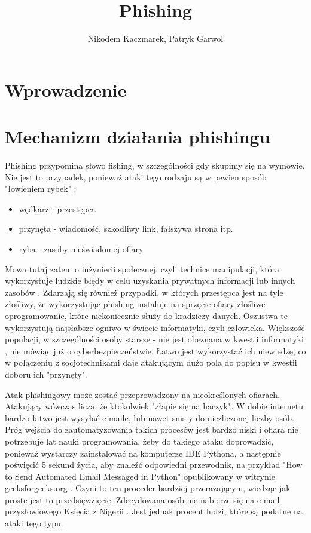 \documentclass[]{article}
\title{Phishing}
\author{Nikodem Kaczmarek, Patryk Garwol}
\begin{document}
\maketitle

\newpage 

\section{Wprowadzenie}



\newpage
\section{Mechanizm działania phishingu}

Phishing przypomina słowo fishing, w szczególności gdy skupimy się na wymowie. Nie jest to przypadek, ponieważ ataki tego rodzaju są w pewien sposób "łowieniem rybek" \cite{govpl_phishing}:
\begin{itemize}[label=$\rightarrow$]
	\item wędkarz - przestępca
	\item przynęta - wiadomość, szkodliwy link, fałszywa strona itp.
	\item ryba - zasoby nieświadomej ofiary
\end{itemize} 

Mowa tutaj zatem o inżynierii społecznej, czyli technice manipulacji, która wykorzystuje ludzkie błędy w celu uzyskania prywatnych informacji lub innych zasobów \cite{kaspersky_social_engineering}.
Zdarzają się również przypadki, w których przestępca jest na tyle złośliwy, że wykorzystując phishing instaluje na sprzęcie ofiary złośliwe oprogramowanie, które niekoniecznie służy do kradzieży danych. Oszustwa te wykorzystują najsłabsze ogniwo w świecie informatyki, czyli człowieka. Większość populacji, w szczególności osoby starsze - nie jest obeznana w kwestii informatyki \cite{dsgi_wiley}, nie mówiąc już o cyberbezpieczeństwie. Łatwo jest wykorzystać ich niewiedzę, co w połączeniu z socjotechnikami daje atakującym dużo pola do popisu w kwestii doboru ich "przynęty".

Atak phishingowy może zostać przeprowadzony na nieokreślonych ofiarach. Atakujący wówczas liczą, że ktokolwiek "złapie się na haczyk". W dobie internetu bardzo łatwo jest wysyłać e-maile, lub nawet sms-y do niezliczonej liczby osób. Próg wejścia do zautomatyzowania takich procesów jest bardzo niski i ofiara nie potrzebuje lat nauki programowania, żeby do takiego ataku doprowadzić, ponieważ wystarczy zainstalować na komputerze IDE Pythona, a następnie poświęcić 5 sekund życia, aby znaleźć odpowiedni przewodnik, na przykład "How to Send Automated Email Messaged in Python" opublikowany w witrynie geeksforgeeks.org \cite{geeks4geeks_automaticmails}. Czyni to ten proceder bardziej przerażającym, wiedząc jak proste jest to przedsięwzięcie. Zdecydowana osób nie nabierze się na e-mail przysłowiowego Księcia z Nigerii \cite{nigerian_prince}. Jest jednak procent ludzi, które są podatne na ataki tego typu.
\end{document}
